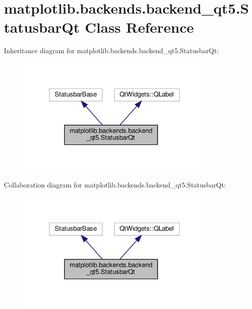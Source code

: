 \hypertarget{classmatplotlib_1_1backends_1_1backend__qt5_1_1StatusbarQt}{}\section{matplotlib.\+backends.\+backend\+\_\+qt5.\+Statusbar\+Qt Class Reference}
\label{classmatplotlib_1_1backends_1_1backend__qt5_1_1StatusbarQt}


Inheritance diagram for matplotlib.\+backends.\+backend\+\_\+qt5.\+Statusbar\+Qt\+:
\nopagebreak
\begin{figure}[H]
\begin{center}
\leavevmode
\includegraphics[width=280pt]{classmatplotlib_1_1backends_1_1backend__qt5_1_1StatusbarQt__inherit__graph}
\end{center}
\end{figure}


Collaboration diagram for matplotlib.\+backends.\+backend\+\_\+qt5.\+Statusbar\+Qt\+:
\nopagebreak
\begin{figure}[H]
\begin{center}
\leavevmode
\includegraphics[width=280pt]{classmatplotlib_1_1backends_1_1backend__qt5_1_1StatusbarQt__coll__graph}
\end{center}
\end{figure}
